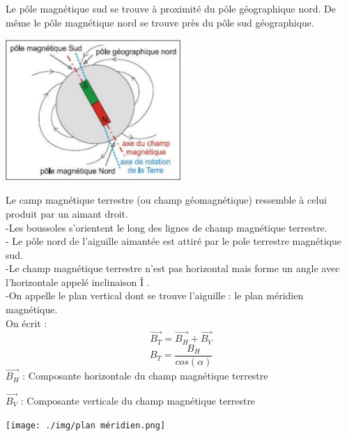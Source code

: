 \documentclass[12pt]{article}
\begin{document}
Le pôle magnétique sud se trouve à proximité du pôle géographique nord. De même le
pôle magnétique nord se trouve près du pôle sud géographique.
\begin{center}

    \includegraphics[width=0.5\textwidth]{./img/champ_terrestre.png}
\end{center}
Le camp magnétique terrestre (ou champ géomagnétique) ressemble à celui produit
par un aimant droit.
\\-Les boussoles s’orientent le long des lignes de champ magnétique terrestre.
\\- Le pôle nord de l’aiguille aimantée est attiré par le pole terrestre magnétique sud.
\\-Le champ magnétique terrestre n’est pas horizontal mais forme un angle avec
l’horizontale appelé inclinaison Î .
\\-On appelle le plan vertical dont se trouve l’aiguille : le plan méridien magnétique. 
\\On écrit : $$\vec{B_T} = \vec{B_H} + \vec{B_V}$$
$$B_T = \frac{B_H}{cos(\alpha)}$$
$\vec{B_H}$ : Composante horizontale du champ magnétique terrestre

$\vec{B_V}$ : Composante verticale du champ magnétique terrestre

    \texttt{[image: ./img/plan méridien.png]}
\end{document}
